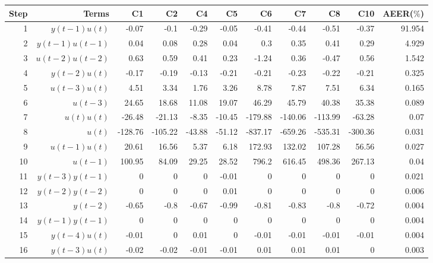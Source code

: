 \begin{tabular}{rrrrrrrrrrr}
Step & Terms & C1 & C2 & C4 & C5 & C6 & C7 & C8 & C10 & AEER($\%$) \\ 
\hline 
1 & $y(t-1)u(t)$ & -0.07 & -0.1 & -0.29 & -0.05 & -0.41 & -0.44 & -0.51 & -0.37 & 91.954 \\ 
2 & $y(t-1)u(t-1)$ & 0.04 & 0.08 & 0.28 & 0.04 & 0.3 & 0.35 & 0.41 & 0.29 & 4.929 \\ 
3 & $u(t-2)u(t-2)$ & 0.63 & 0.59 & 0.41 & 0.23 & -1.24 & 0.36 & -0.47 & 0.56 & 1.542 \\ 
4 & $y(t-2)u(t)$ & -0.17 & -0.19 & -0.13 & -0.21 & -0.21 & -0.23 & -0.22 & -0.21 & 0.325 \\ 
5 & $u(t-3)u(t)$ & 4.51 & 3.34 & 1.76 & 3.26 & 8.78 & 7.87 & 7.51 & 6.34 & 0.165 \\ 
6 & $u(t-3)$ & 24.65 & 18.68 & 11.08 & 19.07 & 46.29 & 45.79 & 40.38 & 35.38 & 0.089 \\ 
7 & $u(t)u(t)$ & -26.48 & -21.13 & -8.35 & -10.45 & -179.88 & -140.06 & -113.99 & -63.28 & 0.07 \\ 
8 & $u(t)$ & -128.76 & -105.22 & -43.88 & -51.12 & -837.17 & -659.26 & -535.31 & -300.36 & 0.031 \\ 
9 & $u(t-1)u(t)$ & 20.61 & 16.56 & 5.37 & 6.18 & 172.93 & 132.02 & 107.28 & 56.56 & 0.027 \\ 
10 & $u(t-1)$ & 100.95 & 84.09 & 29.25 & 28.52 & 796.2 & 616.45 & 498.36 & 267.13 & 0.04 \\ 
11 & $y(t-3)y(t-1)$ & 0 & 0 & 0 & -0.01 & 0 & 0 & 0 & 0 & 0.021 \\ 
12 & $y(t-2)y(t-2)$ & 0 & 0 & 0 & 0.01 & 0 & 0 & 0 & 0 & 0.006 \\ 
13 & $y(t-2)$ & -0.65 & -0.8 & -0.67 & -0.99 & -0.81 & -0.83 & -0.8 & -0.72 & 0.004 \\ 
14 & $y(t-1)y(t-1)$ & 0 & 0 & 0 & 0 & 0 & 0 & 0 & 0 & 0.004 \\ 
15 & $y(t-4)u(t)$ & -0.01 & 0 & 0.01 & 0 & -0.01 & -0.01 & -0.01 & -0.01 & 0.004 \\ 
16 & $y(t-3)u(t)$ & -0.02 & -0.02 & -0.01 & -0.01 & 0.01 & 0.01 & 0.01 & 0 & 0.003 \\ 
\hline 
\end{tabular}